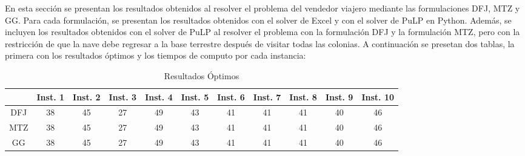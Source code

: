 \documentclass[
	spanish, %
	oneside
]{article}
\begin{document}
En esta sección se presentan los resultados obtenidos al resolver el problema del vendedor viajero mediante las formulaciones DFJ, MTZ y GG. Para cada formulación, se presentan los resultados obtenidos con el solver de Excel y con el solver de PuLP en Python. Además, se incluyen los resultados obtenidos con el solver de PuLP al resolver el problema con la formulación DFJ y la formulación MTZ, pero con la restricción de que la nave debe regresar a la base terrestre después de visitar todas las colonias.
A continuación se presetan dos tablas, la primera con los resultados óptimos y los tiempos de computo por cada instancia:

\begin{table}[h]
\centering
\begin{tabular}{|c|c|c|c|c|c|c|c|c|c|c|}
\hline
& Inst. 1 & Inst. 2 & Inst. 3 & Inst. 4 & Inst. 5 & Inst. 6 & Inst. 7 & Inst. 8 & Inst. 9 & Inst. 10 \\ \hline
\hline
DFJ & 38 & 45 & 27 & 49 & 43 & 41 & 41 & 41 & 40 & 46\\
MTZ & 38 & 45 & 27 & 49 & 43 & 41 & 41 & 41 & 40 & 46\\
GG & 38 & 45 & 27 & 49 & 43 & 41 & 41 & 41 & 40 & 46\\
\hline
\end{tabular}
\caption{Resultados Óptimos}
\label{tab:results}
\end{table}













\end{document}
